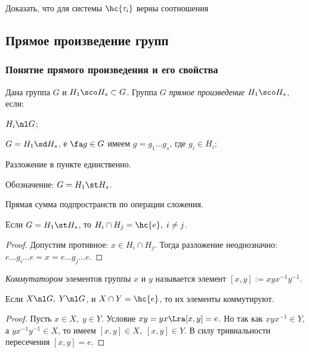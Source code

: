 \documentclass[a4paper]{article}
\begin{document}
\begin{problem}
Доказать, что для системы $\hc{\tau_i}$ верны соотношения
\end{problem}

\subsection{Прямое произведение групп}

\subsubsection{Понятие прямого произведения и его свойства}

\begin{df}
Дана группа $G$ и $H_1 \sco H_s \subset G$. Группа $G$ \emph{прямое произведение} $H_1 \sco H_s$, если:

 $H_i \nl G$;

 $G = H_1 \sd H_s$, е $\fa g \in G$ имеем $g=g_1 \ldots g_s$, где $g_i \in H_i$;

 Разложение в пункте  единственно.

Обозначение: $G= H_1 \st H_s$.
\end{df}

\begin{ex}
Прямая сумма подпространств по операции сложения.
\end{ex}

\begin{imp}
Если $G = H_1 \st H_s$, то $H_i \cap H_j = \hc{e}, \; i \neq j$.
\end{imp}
\begin{proof}
Допустим противное: $x \in H_i \cap H_j$. Тогда разложение неоднозначно:
$e \ldots g_i \ldots e = x = e\ldots g_j\ldots e$.
\end{proof}

\begin{df}
\emph{Коммутатором} элементов группы $x$ и $y$ называется элемент $[x,y] := xyx^{-1}y^{-1}$.
\end{df}

\begin{stm}
Если $X \nl G, \; Y \nl G$, и $X \cap Y = \hc{e}$, то их элементы коммутируют.
\end{stm}
\begin{proof}
Пусть $x \in X, \; y \in Y$. Условие $xy=yx \Lra [x,y]=e$. Но так как $xyx^{-1} \in Y$, а $yx^{-1}y^{-1} \in
X$,  то имеем $[x,y] \in X, \; [x,y] \in Y$. В силу тривиальности пересечения $[x,y]=e$.
\end{proof}
\end{document}
